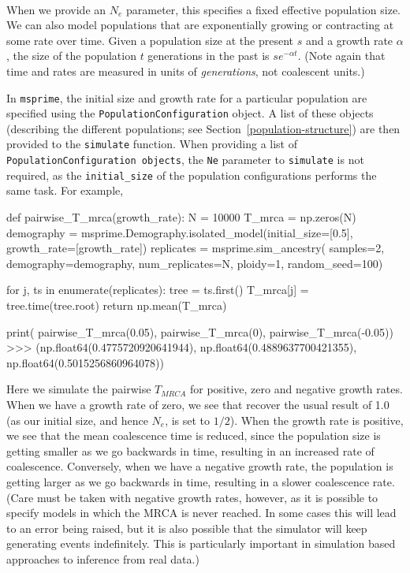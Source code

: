 \documentclass[graybox]{svmult}
\newcommand{\msprime}[0]{\texttt{msprime}}
\begin{document}
\label{exponentially-growingshrinking-populations} \

When we provide an \(N_e\) parameter, this specifies a fixed effective
population size. We can also model populations that are exponentially
growing or contracting at some rate over time. Given a population size
at the present \(s\) and a growth rate \(\alpha\), the size of the
population \(t\) generations in the past is $s e^{-\alpha t}$. (Note
again that time and rates are measured in units of \emph{generations},
not coalescent units.)

In \msprime, the initial size and growth rate for a particular population
are specified using the \texttt{PopulationConfiguration} object. A list
of these objects (describing the different populations; see
Section~\ref{population-structure}) are then provided to the
\texttt{simulate}
function. When providing a list of
\texttt{PopulationConfiguration\ objects}, the \texttt{Ne} parameter to
\texttt{simulate} is not required, as the \texttt{initial\_size} of the
population configurations performs the same task. For example,

\begin{pythoncode}
def pairwise_T_mrca(growth_rate):
    N = 10000
    T_mrca = np.zeros(N)
    demography = msprime.Demography.isolated_model(initial_size=[0.5],
                                                   growth_rate=[growth_rate])
    replicates = msprime.sim_ancestry(
        samples=2,
        demography=demography,
        num_replicates=N,
        ploidy=1,
        random_seed=100)

    for j, ts in enumerate(replicates):
        tree = ts.first()
        T_mrca[j] = tree.time(tree.root)
    return np.mean(T_mrca)

print(
    pairwise_T_mrca(0.05), pairwise_T_mrca(0),
    pairwise_T_mrca(-0.05))
>>> (np.float64(0.4775720920641944),
     np.float64(0.4889637700421355),
     np.float64(0.5015256860964078))
\end{pythoncode}

    Here we simulate the pairwise \(T_{MRCA}\) for positive, zero and
negative growth rates. When we have a growth rate of zero, we see that
recover the usual result of 1.0 (as our initial size, and hence \(N_e\),
is set to \(1/2\)). When the growth rate is positive, we see that the
mean coalescence time is reduced, since the population size is getting
smaller as we go backwards in time, resulting in an increased rate of
coalescence. Conversely, when we have a negative growth rate, the
population is getting larger as we go backwards in time, resulting in a
slower coalescence rate. (Care must be taken with negative growth rates,
however, as it is possible to specify models in which the MRCA is never
reached. In some cases this will lead to an error being raised, but it
is also possible that the simulator will keep generating events
indefinitely. This is particularly important in simulation based
approaches to inference from real data.)
\end{document}

